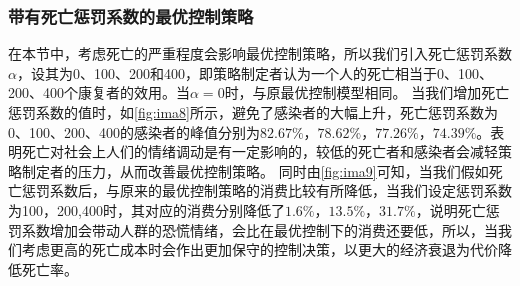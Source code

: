 \vspace{135em }
\subsubsection{带有死亡惩罚系数的最优控制策略}
在本节中，考虑死亡的严重程度会影响最优控制策略，所以我们引入死亡惩罚系数$\alpha$，设其为0、100、200和400，即策略制定者认为一个人的死亡相当于0、100、200、400个康复者的效用。当$\alpha=0$时，与原最优控制模型相同。
当我们增加死亡惩罚系数的值时，如\autoref{fig:ima8}所示，避免了感染者的大幅上升，死亡惩罚系数为0、100、200、400的感染者的峰值分别为$82.67\%$，$78.62\%$，$77.26\%$，$74.39\%$。表明死亡对社会上人们的情绪调动是有一定影响的，较低的死亡者和感染者会减轻策略制定者的压力，从而改善最优控制策略。
同时由\autoref{fig:ima9}可知，当我们假如死亡惩罚系数后，与原来的最优控制策略的消费比较有所降低，当我们设定惩罚系数为100，200,400时，其对应的消费分别降低了$1.6\%$，$13.5\%$，$31.7\%$，说明死亡惩罚系数增加会带动人群的恐慌情绪，会比在最优控制下的消费还要低，所以，当我们考虑更高的死亡成本时会作出更加保守的控制决策，以更大的经济衰退为代价降低死亡率。

